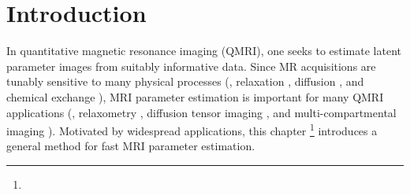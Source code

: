
\section{Introduction}
\label{s,perk,intro}

In quantitative magnetic resonance imaging (QMRI),
one seeks to estimate latent parameter images 
from suitably informative data.
Since MR acquisitions are tunably sensitive 
to many physical processes
(\eg, relaxation \cite{bloch:1946:ni-paper}, 
diffusion \cite{torrey:56:bew},
and chemical exchange \cite{mcconnell:58:rrb}),
MRI parameter estimation is important
for many QMRI applications
(\eg, relaxometry \cite{bloembergen:1948:rei}, 
diffusion tensor imaging \cite{bihan:01:dti}, 
and multi-compartmental imaging \cite{mackay:94:ivv}). 
Motivated by widespread applications,
this chapter
\footnote{%
%
}
introduces a general method
for fast MRI parameter estimation.

